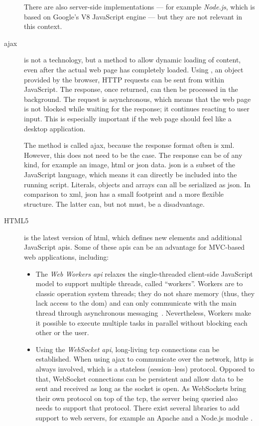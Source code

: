 \begin{description}
	There are also server-side implementations --- for example \emph{Node.js}, which is based on Google's V8 JavaScript engine --- but they are not relevant in this context.
	\item[\gls{ajax}] is not a technology, but a method to allow dynamic loading of content, even after the actual web page has completely loaded. Using , an object provided by the browser, HTTP requests can be sent from within JavaScript. The response, once returned, can then be processed in the background. The request is asynchronous, which means that the web page is not blocked while waiting for the response; it continues reacting to user input. This is especially important if the web page should feel like a desktop application.

	The method is called \acl{ajax}, because the response format often is \gls{xml}. However, this does not need to be the case. The response can be of any kind, for example an image, \gls{html} or \gls{json} data. \gls{json} is a subset of the JavaScript language, which means it can directly be included into the running script. Literals, objects and arrays can all be serialized as \gls{json}. In comparison to \gls{xml}, \gls{json} has a small footprint and a more flexible structure. The latter can, but not must, be a disadvantage.

	\item[HTML5] is the latest version of \gls{html}, which defines new elements and additional JavaScript \glspl{api}. Some of these \glspl{api} can be an advantage for MVC-based web applications, including:
	\begin{itemize}
		\item The \emph{Web Workers \gls{api}} relaxes the single-threaded client-side JavaScript model to support multiple threads, called ``workers''. Workers are to classic operation system threads; they do not share memory (thus, they lack access to the \gls{dom}) and can only communicate with the main thread through asynchronous messaging~\cite[pp. 680--687]{flanagan}. Nevertheless, Workers make it possible to execute multiple tasks in parallel without blocking each other or the user.

		\item Using the \emph{WebSocket \gls{api}}, long-living \acs{tcp} connections can be established. When using \gls{ajax} to communicate over the network, \gls{http} is always involved, which is a stateless (session--less) protocol. Opposed to that, WebSocket connections can be persistent and allow data to be sent and received as long as the socket is open. As WebSockets bring their own protocol on top of the \gls{tcp}, the server being queried also needs to support that protocol. There exist several libraries to add support to web servers, for example an Apache and a Node.js module \cite[pp. 712--716]{flanagan}.


\end{itemize}
\end{description}

